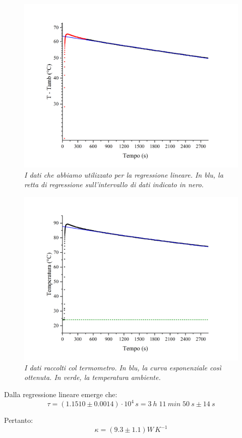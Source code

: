 \documentclass{article}
\begin{document}
\begin{center}
    \begin{figure}[H]
        \includegraphics[trim={2cm 1cm 2cm 2.1cm},clip,width=\textwidth]{img/LogLinFit.jpg}
        \caption{\emph{I dati che abbiamo utilizzato per la regressione lineare.
        In blu, la retta di regressione sull'intervallo di dati indicato in nero.
        }}
    \end{figure}
\end{center}
\begin{center}
    \begin{figure}[H]
        \includegraphics[trim={2cm 1cm 2cm 2.1cm},clip,width=\textwidth]{img/ExpFit.jpg}
        \caption[]{\emph{I dati raccolti col termometro.
        In blu, la curva esponenziale così ottenuta.
        In verde, la temperatura ambiente.
        }}
    \end{figure}
\end{center}

Dalla regressione lineare emerge che:
\[\tau = \left(1.1510\pm0.0014\right)\cdot 10^4\,\unit{s} = \qty{3}{h}\;\qty{11}{min}\;\qty{50}{s}\pm\qty{14}{s}\]

Pertanto:
\[\kappa = \left(9.3\pm1.1\right)\unit{W\,K^{-1}}\]
\end{document}
